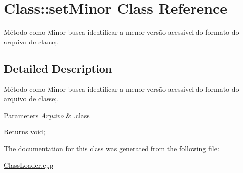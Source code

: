 \hypertarget{class_class_1_1set_minor}{}\section{Class\+:\+:set\+Minor Class Reference}
\label{class_class_1_1set_minor}


Método como Minor busca identificar a menor versão acessivel do formato do arquivo de classe;.  




\subsection{Detailed Description}
Método como Minor busca identificar a menor versão acessivel do formato do arquivo de classe;. 


\begin{DoxyParams}{Parameters}
{\em Arquivo} & .class \\
\hline
\end{DoxyParams}
\begin{DoxyReturn}{Returns}
void; 
\end{DoxyReturn}


The documentation for this class was generated from the following file\+:\begin{DoxyCompactItemize}
\item 
\hyperlink{_class_loader_8cpp}{Class\+Loader.\+cpp}\end{DoxyCompactItemize}
